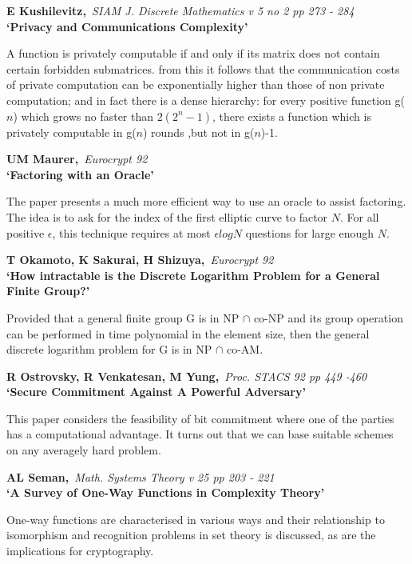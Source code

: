 {\bf \noindent E Kushilevitz,}{\em ~SIAM J. Discrete Mathematics v 5 no 2 pp
273 - 284\\}
{\bf `Privacy and Communications Complexity'}

A function is privately computable if and only if its matrix does not contain
certain forbidden submatrices. from this it follows that the communication
costs of private computation can be exponentially higher than those of non
private computation; and in fact there is a dense hierarchy: for every
positive function g($n$) which grows no faster than $2(2^n-1)$, there exists a
function which is privately computable in g($n$) rounds ,but not in g($n$)-1.

{\bf \noindent UM Maurer,}{\em ~Eurocrypt 92\\}
{\bf `Factoring with an Oracle'}

The paper presents a much more efficient way to use an oracle to assist 
factoring. The idea is to ask for the index of the first elliptic curve to 
factor $N$. For all positive $\epsilon$, this technique requires at most 
$\epsilon log{N}$ questions for large enough $N$.

{\bf \noindent T Okamoto, K Sakurai, H Shizuya,}{\em ~Eurocrypt 92\\}
{\bf `How intractable is the Discrete Logarithm Problem for a General
Finite Group?'}

Provided that a general finite group G is in NP $\cap$ co-NP and its group 
operation can be performed in time polynomial in the element size, then the 
general discrete logarithm problem for G is in NP $\cap$ co-AM.

{\bf \noindent R Ostrovsky, R Venkatesan, M Yung,}{\em ~Proc. STACS 92 pp
449   -460\\}
{\bf `Secure Commitment Against A Powerful Adversary'}

This paper considers the feasibility of bit commitment where one of the parties
has a computational advantage. It turns out that we can base suitable schemes
on any averagely hard problem.
 
{\bf \noindent AL Seman,}{\em ~Math. Systems Theory v 25 pp 203 - 221\\}
{\bf `A Survey of One-Way Functions in Complexity Theory'}

One-way functions are characterised in various ways and their relationship
to isomorphism and recognition problems in set theory is discussed, as 
are the implications for cryptography.




